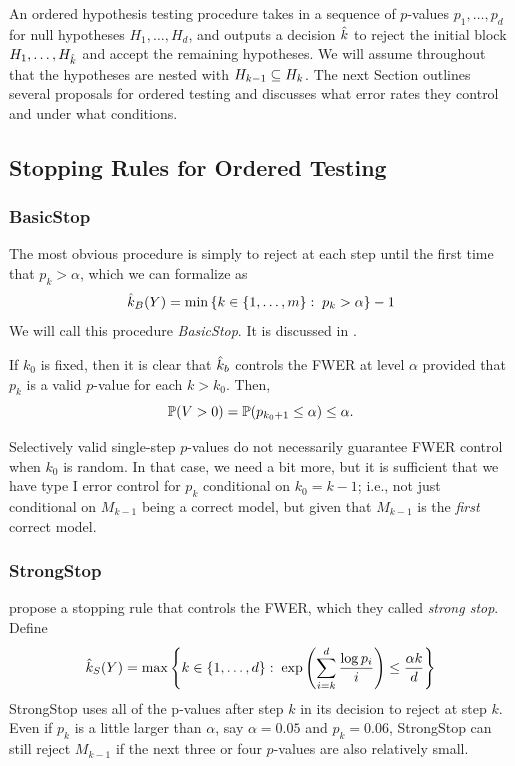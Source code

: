 \documentclass{article}
\begin{document}
An ordered hypothesis testing procedure takes in a sequence of $p$-values $p_1, \ldots, p_d$ for null hypotheses $H_{1}, \ldots, H_{d}$, and outputs a decision $\hk$ to reject the initial block $H_{1}, \ldots, H_{\hk}$ and accept the remaining hypotheses. We will assume throughout that the hypotheses are nested with $H_{k-1} \sub H_k$. The next Section outlines several proposals for ordered testing and discusses what error rates they control and under what conditions. 

\subsection{Stopping Rules for Ordered Testing}
\label{sec:orderedProposals}


\subsubsection{BasicStop}
The most obvious procedure is simply to reject at each step until the first time that $p_k > \alpha$, which we can formalize as
\[
\hk_B(Y) = \min\left\{k \in \{1,\ldots,m\} :\;
  p_k > \alpha\right\} - 1
\]
We will call this procedure {\em BasicStop}. 
It is discussed in \citet{marcus1976}.

If $k_0$ is fixed, then it is clear that $\hk_b$ controls the FWER at level $\alpha$ provided that $p_{k}$ is a valid $p$-value for each $k>k_0$. Then, 
\[
\P(V>0) = \P(p_{k_0+1} \leq \alpha) \leq \alpha.
\]

Selectively valid single-step $p$-values do not necessarily guarantee FWER control when $k_0$ is random. In that case, we need a bit more, but it is sufficient that we have type I error control for $p_k$ conditional on $k_0=k-1$; i.e., not just conditional on $M_{k-1}$ being a correct model, but given that $M_{k-1}$ is the {\em first} correct model.


\subsubsection{StrongStop}

\citet{gsell2013sequential} propose a stopping rule that controls the FWER, which they called {\em strong stop}. Define
\[
  \hk_{S}(Y) = \max\left\{k \in \{1,\ldots,d\} :\;
    \exp\left(\sum_{i=k}^d \frac{\log p_i}{i}\right) 
    \leq \frac{\alpha k}{d}\right\}
\]
StrongStop uses all of the p-values after step $k$ in its decision to reject at step $k$. 
Even if $p_k$ is a little larger than $\alpha$, say $\alpha=0.05$ and $p_k=0.06$, StrongStop can still reject $M_{k-1}$ if the next three or four $p$-values are also relatively small.
\end{document}
